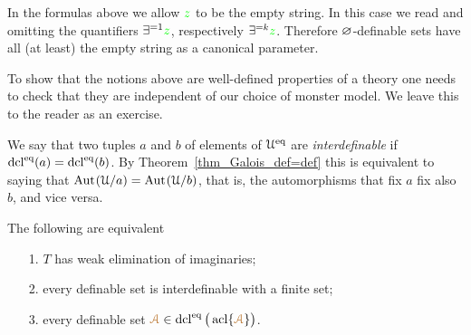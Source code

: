 \documentclass[creche.tex]{subfiles}
\begin{document}
In the formulas above we allow ${\color{green} z}$ to be the empty string.
In this case we read  and  omitting the quantifiers $\exists^{=1}{\color{green} z}$, respectively $\exists^{=k}{\color{green} z}$.
Therefore $\varnothing$-definable sets have all (at least) the empty string as a canonical parameter.

To show that the notions above are well-defined properties of a theory one needs to check that they are independent of our choice of monster model.
We leave this to the reader as an exercise.

We say that two tuples $a$ and $b$ of elements of $\EuScript U^{{\rm eq}}$ are \emph{interdefinable\/} if $\mathop{\rm dcl}^{{\rm eq}}(a)=\mathop{\rm dcl}^{{\rm eq}}(b)$.
By Theorem~\ref{thm_Galois_def=def} this is equivalent to saying that ${\rm Aut\kern.15ex}(\EuScript U/a)={\rm Aut\kern.15ex}(\EuScript U/b)$, that is, the automorphisms that fix $a$ fix also $b$, and vice versa.

\begin{theorem}\label{elimimd}
The following are equivalent
\begin{itemize}
\item[1.] $T$ has weak elimination of imaginaries;
\item[2.] every definable set is interdefinable with a finite set;
\item[3.] every definable set ${\color{brown}\EuScript A}\in\mathop{\rm dcl}^{{\rm eq}}\big(\mathop{\rm acl}\{{\color{brown}\EuScript A}\}\big)$.
\end{itemize}
\end{theorem}

\end{document}
